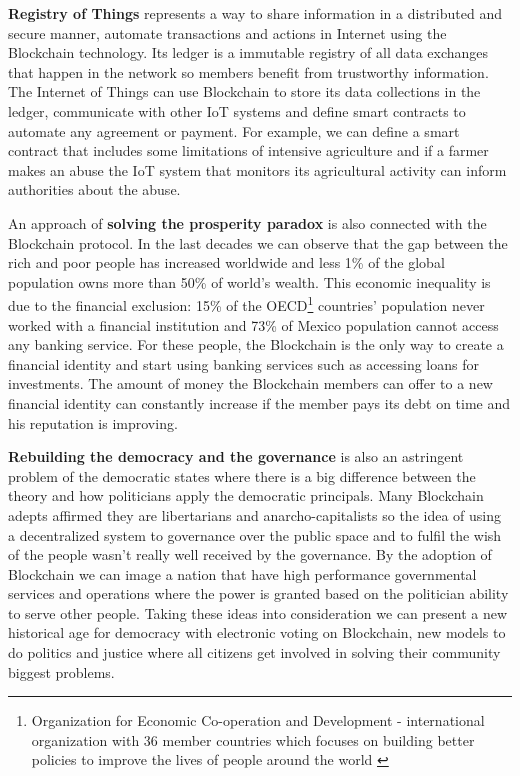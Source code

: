 \textbf{Registry of Things} represents a way to share information in a distributed and secure manner, automate transactions and actions in Internet using the Blockchain technology. Its ledger is a immutable registry of all data exchanges that happen in the network so members benefit from trustworthy information. The Internet of Things can use Blockchain to store its data collections in the ledger, communicate with other IoT systems and define smart contracts to automate any agreement or payment. For example, we can define a smart contract that includes some limitations of intensive agriculture and if a farmer makes an abuse the IoT system that monitors its agricultural activity can inform authorities about the abuse.

An approach of \textbf{solving the prosperity paradox} is also connected with the Blockchain protocol. In the last decades we can observe that the gap between the rich and poor people has increased worldwide and less 1\% of the global population owns more than 50\% of world's wealth. This economic inequality is due to the financial exclusion: 15\% of the OECD\footnote{Organization for Economic Co-operation and Development - international organization  with 36 member countries which focuses on building better policies to improve the lives of people around the world \cite{oecd}} countries' population never worked with a financial institution and 73\% of Mexico population cannot access any banking service. For these people, the Blockchain is the only way to create a financial identity and start using banking services such as accessing loans for investments. The amount of money the Blockchain members can offer to a new financial identity can constantly increase if the member pays its debt on time and his reputation is improving.

\textbf{Rebuilding the democracy and the governance} is also an astringent problem of the democratic states where there is a big difference between the theory and how politicians apply the democratic principals. Many Blockchain adepts affirmed they are libertarians and anarcho-capitalists so the idea of using a decentralized system to governance over the public space and to fulfil the wish of the people wasn't really well received by the governance. By the adoption of Blockchain we can image a nation that have high performance governmental services and operations where the power is granted based on the politician ability to serve other people. Taking these ideas into consideration we can present a new historical age for democracy with electronic voting on Blockchain, new models to do politics and justice where all citizens get involved in solving their community biggest problems.

